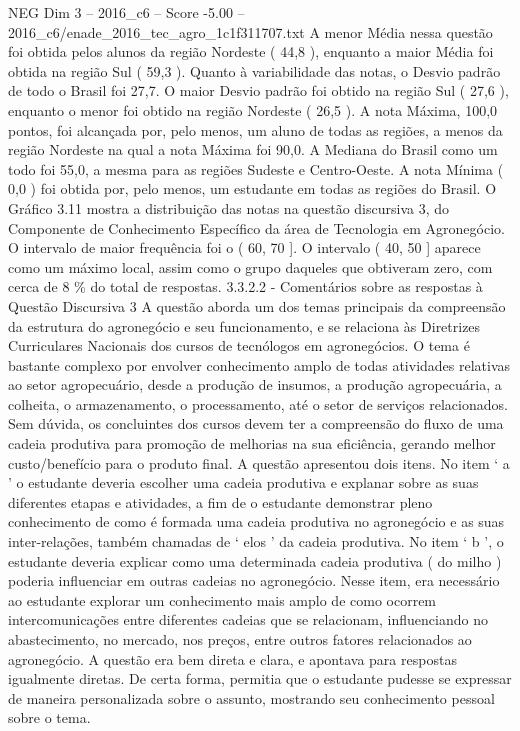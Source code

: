 \begin{textsample}{NEG Dim 3 – 2016\_c6 – Score -5.00 – 2016\_c6/enade\_2016\_tec\_agro\_1c1f311707.txt}
A menor Média nessa questão foi obtida pelos alunos da região Nordeste ( 44,8 ), enquanto a maior Média foi obtida na região Sul ( 59,3 ).
Quanto à variabilidade das notas, o Desvio padrão de todo o Brasil foi 27,7.
O maior Desvio padrão foi obtido na região Sul ( 27,6 ), enquanto o menor foi obtido na região Nordeste ( 26,5 ).
A nota Máxima, 100,0 pontos, foi alcançada por, pelo menos, um aluno de todas as regiões, a menos da região Nordeste na qual a nota Máxima foi 90,0.
A Mediana do Brasil como um todo foi 55,0, a mesma para as regiões Sudeste e Centro-Oeste.
A nota Mínima ( 0,0 ) foi obtida por, pelo menos, um estudante em todas as regiões do Brasil.
O Gráfico 3.11 mostra a distribuição das notas na questão discursiva 3, do Componente de Conhecimento Específico da área de Tecnologia em Agronegócio.
O intervalo de maior frequência foi o ( 60, 70 ].
O intervalo ( 40, 50 ] aparece como um máximo local, assim como o grupo daqueles que obtiveram zero, com cerca de 8 \% do total de respostas. 3.3.2.2 - Comentários sobre as respostas à Questão Discursiva 3 A questão aborda um dos temas principais da compreensão da estrutura do agronegócio e seu funcionamento, e se relaciona às Diretrizes Curriculares Nacionais dos cursos de tecnólogos em agronegócios.
O tema é bastante complexo por envolver conhecimento amplo de todas atividades relativas ao setor agropecuário, desde a produção de insumos, a produção agropecuária, a colheita, o armazenamento, o processamento, até o setor de serviços relacionados.
Sem dúvida, os concluintes dos cursos devem ter a compreensão do fluxo de uma cadeia produtiva para promoção de melhorias na sua eficiência, gerando melhor custo/benefício para o produto final.
A questão apresentou dois itens.
No item ‘ a ’ o estudante deveria escolher uma cadeia produtiva e explanar sobre as suas diferentes etapas e atividades, a fim de o estudante demonstrar pleno conhecimento de como é formada uma cadeia produtiva no agronegócio e as suas inter-relações, também chamadas de ‘ elos ’ da cadeia produtiva.
No item ‘ b ’, o estudante deveria explicar como uma determinada cadeia produtiva ( do milho ) poderia influenciar em outras cadeias no agronegócio.
Nesse item, era necessário ao estudante explorar um conhecimento mais amplo de como ocorrem intercomunicações entre diferentes cadeias que se relacionam, influenciando no abastecimento, no mercado, nos preços, entre outros fatores relacionados ao agronegócio.
A questão era bem direta e clara, e apontava para respostas igualmente diretas.
De certa forma, permitia que o estudante pudesse se expressar de maneira personalizada sobre o assunto, mostrando seu conhecimento pessoal sobre o tema.

\end{textsample}
